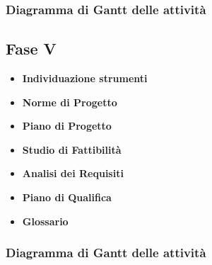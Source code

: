 		\subsubsection{Diagramma di Gantt delle attività}
		
	\subsection{Fase V}
		\begin{itemize}
			\item \textbf{Individuazione strumenti} 
			\item \textbf{Norme di Progetto}
			\item \textbf{Piano di Progetto}
			\item \textbf{Studio di Fattibilità}
			\item \textbf{Analisi dei Requisiti}
			\item \textbf{Piano di Qualifica}
			\item \textbf{Glossario}
		\end{itemize}
		\subsubsection{Diagramma di Gantt delle attività}
	
